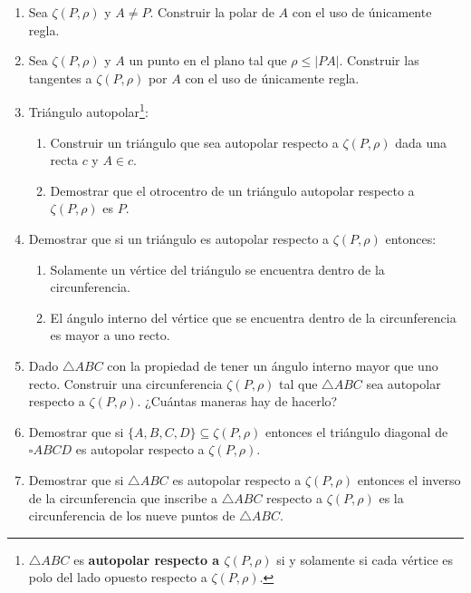 \documentclass[12pt]{report}
\numberwithin{section}{chapter}
\begin{document}
\begin{enumerate}
\item Sea $\zeta(P,\rho)$ y $A \neq P$. Construir la polar de $A$ con el uso de únicamente regla.

\item Sea $\zeta(P,\rho)$ y $A$ un punto en el plano tal que $\rho \leq |PA|$. Construir las tangentes a $\zeta(P, \rho)$ por $A$ con el uso de únicamente regla.

\item Triángulo autopolar\footnote{$\triangle ABC$ es \textbf{autopolar respecto a $\zeta(P, \rho)$} si y solamente si cada vértice es polo del lado opuesto respecto a $\zeta(P, \rho)$.}:
\begin{enumerate}
\item Construir un triángulo que sea autopolar respecto a $\zeta(P,\rho)$ dada una recta $c$ y $A \in c$.
\item Demostrar que el otrocentro de un triángulo autopolar respecto a $\zeta(P,\rho)$ es $P$.
\end{enumerate}

\item Demostrar que si un triángulo es autopolar respecto a $\zeta(P,\rho)$ entonces:
\begin{enumerate}
\item Solamente un vértice del triángulo se encuentra dentro de la circunferencia.
\item El ángulo interno del vértice que se encuentra dentro de la circunferencia es mayor a uno recto.
\end{enumerate}

\item Dado $\triangle ABC$ con la propiedad de tener un ángulo interno mayor que uno recto. Construir una circunferencia $\zeta(P,\rho)$ tal que $\triangle ABC$ sea autopolar respecto a $\zeta(P,\rho)$. ¿Cuántas maneras hay de hacerlo? 

\item Demostrar que si $\{A,B,C,D\} \subseteq \zeta(P,\rho)$ entonces el triángulo diagonal de $\square ABCD$ es autopolar respecto a $\zeta(P,\rho)$.

\item Demostrar que si $\triangle ABC$ es autopolar respecto a $\zeta(P,\rho)$ entonces el inverso de la circunferencia que inscribe a $\triangle ABC$ respecto a $\zeta(P, \rho)$ es la circunferencia de los nueve puntos de $\triangle ABC$.

\end{enumerate}
\end{document}
